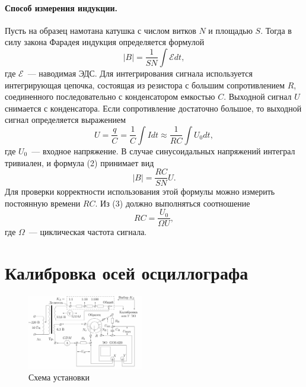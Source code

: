 \documentclass[12pt,a4paper]{article}
\begin{document}
\paragraph{Способ измерения индукции.} Пусть на образец намотана катушка с числом витков $N$ и площадью $S$. Тогда в силу закона Фарадея индукция определяется формулой
\begin{equation}
|B| = \frac{1}{SN}\int\mathscr{E} dt,
\end{equation}
где $\mathscr{E}$~--- наводимая ЭДС. Для интегрирования сигнала используется интегрирующая цепочка, состоящая из резистора с большим сопротивлением $R$, соединенного последовательно с конденсатором емкостью $C$. Выходной сигнал $U$ снимается с конденсатора. Если сопротивление достаточно большое, то выходной сигнал определяется выражением
\begin{equation}
U = \frac{q}{C} = \frac{1}{C}\int Idt \approx \frac{1}{RC}\int U_0 dt,
\end{equation}
где $U_0$~--- входное напряжение. В случае синусоидальных напряжений интеграл тривиален, и формула (2) принимает вид
\begin{equation}
|B| = \frac{RC}{SN}U.
\end{equation}
Для проверки корректности использования этой формулы можно измерить постоянную времени $RC$. Из (3) должно выполняться соотношение
\begin{equation}
RC = \frac{U_0}{\Omega U},
\end{equation}
где $\Omega$~--- циклическая частота сигнала.
\newpage
\section{Калибровка осей осциллографа}
\begin{figure}
\centering\includegraphics[width = 0.45\textwidth]{Pct1}
\captionsetup{justification = centering}
\caption{Схема установки \label{Pct}}
\end{figure}
\end{document}
